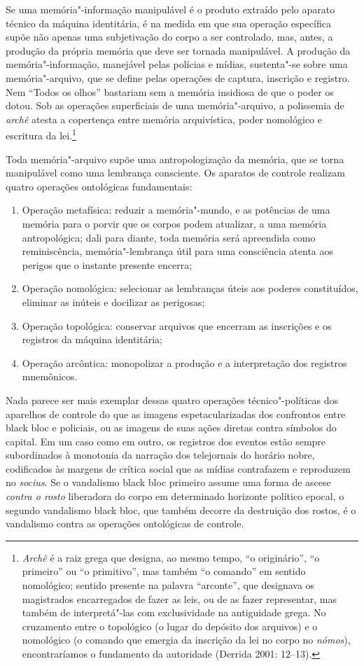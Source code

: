 Se uma memória"-informação manipulável é o produto extraído pelo aparato
técnico da máquina identitária, é na medida em que sua operação
específica supõe não apenas uma subjetivação do corpo a ser controlado,
mas, antes, a produção da própria memória que deve ser tornada
manipulável. A produção da memória"-informação, manejável pelas polícias
e mídias, sustenta"-se sobre uma memória"-arquivo, que se define pelas
operações de captura, inscrição e registro. Nem ``Todos os olhos''
bastariam sem a memória insidiosa de que o poder os dotou. Sob as
operações superficiais de uma memória"-arquivo, a polissemia de
\emph{archê} atesta a copertença entre memória arquivística, poder
nomológico e escritura da lei.\footnote{\emph{Archê} é
  a raiz grega que designa, ao mesmo tempo, ``o originário'', ``o
  primeiro'' ou ``o primitivo'', mas também ``o comando'' em sentido
  nomológico; sentido presente na palavra ``arconte'', que designava os
  magistrados encarregados de fazer as leis, ou de as fazer representar,
  mas também de interpretá"-las com exclusividade na antiguidade grega.
  No cruzamento entre o topológico (o lugar do depósito dos arquivos) e
  o nomológico (o comando que emergia da inscrição da lei no corpo no
  \emph{nómos}), encontraríamos o fundamento da autoridade (Derrida 2001: 12--13).}

Toda memória"-arquivo supõe uma antropologização da memória, que se torna
manipulável como uma lembrança consciente. Os aparatos de controle
realizam quatro operações ontológicas fundamentais:

\begin{enumerate}
\item Operação
metafísica: reduzir a memória"-mundo, e as potências de uma memória para
o porvir que os corpos podem atualizar, a uma memória antropológica;
dali para diante, toda memória será apreendida como reminiscência,
memória"-lembrança útil para uma consciência atenta aos perigos que o
instante presente encerra;
\item Operação nomológica: selecionar as
lembranças úteis aos poderes constituídos, eliminar as inúteis e
docilizar as perigosas;
\item Operação topológica: conservar arquivos que
encerram as inscrições e os registros da máquina identitária;
\item Operação arcôntica: monopolizar a produção e a interpretação dos
registros mnemônicos.
\end{enumerate}

Nada parece ser mais exemplar dessas quatro operações técnico"-políticas
dos aparelhos de controle do que as imagens espetacularizadas dos
confrontos entre black bloc e policiais, ou as imagens de suas ações
diretas contra símbolos do capital. Em um caso como em outro, os
registros dos eventos estão sempre subordinados à monotonia da narração
dos telejornais do horário nobre, codificados às margens de crítica
social que as mídias contrafazem e reproduzem no \emph{socius}. Se o
vandalismo black bloc primeiro assume uma forma de ascese \emph{contra o
rosto} liberadora do corpo em determinado horizonte político epocal, o
segundo vandalismo black bloc, que também decorre da destruição dos
rostos, é o vandalismo contra as operações ontológicas de controle.

